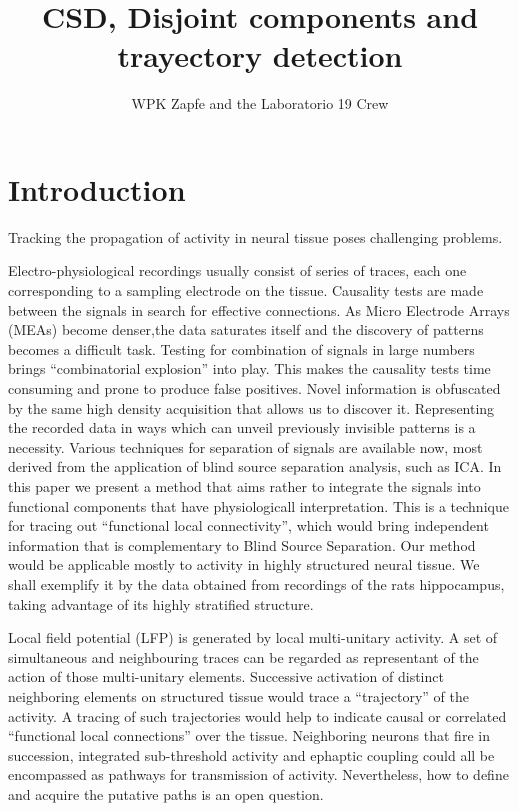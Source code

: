 \documentclass[11pt, letterpaper]{article}
\author{WPK Zapfe and the Laboratorio 19 Crew}
\title{CSD, Disjoint components and trayectory detection}
\begin{document}
\maketitle

\section{Introduction}

Tracking the propagation of activity in neural tissue poses challenging
problems. 

Electro-physiological recordings usually consist of 
 series of traces, each one corresponding to a sampling
electrode on the tissue. Causality tests are made between the
signals in search for effective connections. 
As Micro Electrode Arrays (MEAs) become denser,the data saturates itself
and the discovery of patterns becomes a difficult task.
Testing for combination of signals in large numbers
brings ``combinatorial explosion'' into
play. This makes the causality tests time consuming and
prone to produce false positives.
Novel information is obfuscated by the same high density acquisition that allows us to
discover it. Representing  the recorded data in ways which can unveil previously
invisible patterns is a necessity. Various techniques for separation of signals
are available now, most derived from the application of blind source
separation analysis, such as ICA.
In this paper we present a method that aims rather to integrate
the signals into functional components that
have physiologicall interpretation.
This is a technique for tracing out
``functional local connectivity'', which would bring independent information
that is complementary to Blind Source Separation.
Our  method would be applicable mostly to
activity in highly structured neural tissue. We shall exemplify it by
the data obtained from recordings of the rats hippocampus,
taking advantage of its highly stratified  structure. 

Local field potential (LFP)
is generated by local multi-unitary activity.
A set of simultaneous and neighbouring traces
can be regarded as representant of the action
of those multi-unitary elements. 
Successive activation  of distinct neighboring elements on structured
tissue would trace a
``trajectory'' of the activity. A tracing of such trajectories would help to indicate
causal or correlated ``functional local connections'' over the tissue. Neighboring
neurons that fire in succession, integrated sub-threshold activity and ephaptic coupling
could all be encompassed as pathways for transmission of activity. Nevertheless,
how to define and acquire the putative paths is an open question.
\end{document}

